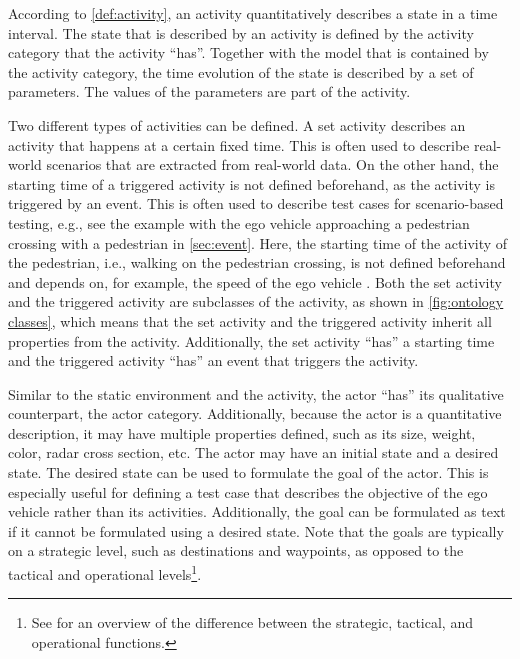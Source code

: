 According to \cref{def:activity}, an activity quantitatively describes a state in a time interval. The state that is described by an activity is defined by the activity category that the activity ``has''. Together with the model that is contained by the activity category, the time evolution of the state is described by a set of parameters. The values of the parameters are part of the activity. 

\cbstart
Two different types of activities can be defined. A set activity describes an activity that happens at a certain fixed time. This is often used to describe real-world scenarios that are extracted from real-world data. On the other hand, the starting time of a triggered activity is not defined beforehand, as the activity is triggered by an event. This is often used to describe test cases for scenario-based testing, e.g., see the example with the ego vehicle approaching a pedestrian crossing with a pedestrian in \cref{sec:event}. Here, the starting time of the activity of the pedestrian, i.e., walking on the pedestrian crossing, is not defined beforehand and depends on, for example, the speed of the ego vehicle \cite{seiniger2015test}. Both the set activity and the triggered activity are subclasses of the activity, as shown in \cref{fig:ontology classes}, which means that the set activity and the triggered activity inherit all properties from the activity. Additionally, the set activity ``has'' a starting time and the triggered activity ``has'' an event that triggers the activity.
\cbend

\cbstart
Similar to the static environment and the activity, the actor ``has'' its qualitative counterpart, the actor category. Additionally, because the actor is a quantitative description, it may have multiple properties defined, such as its size, weight, color, radar cross section, etc. The actor may have an initial state and a desired state. The desired state can be used to formulate the goal of the actor. This is especially useful for defining a test case that describes the objective of the ego vehicle rather than its activities. Additionally, the goal can be formulated as text if it cannot be formulated using a desired state.
Note that the goals are typically on a strategic level, such as destinations and waypoints, as opposed to the tactical and operational levels\footnote{\cbstart See \cite[p.~7, Figure 1]{sae2018j3016} for an overview of the difference between the strategic, tactical, and operational functions.\cbend}.
\cbend


